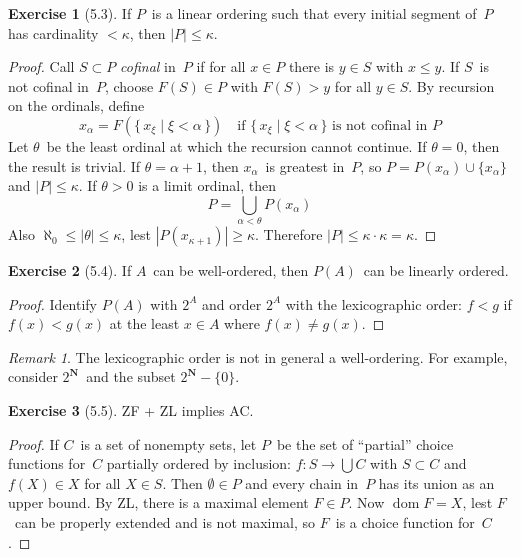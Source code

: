 \documentclass[letterpaper,12pt]{article}
\newcommand{\N}{\boldsymbol{N}}
\newcommand{\union}{\cup}
\newcommand{\bigunion}{\bigcup}
\newcommand{\mult}{\cdot}
\DeclareMathOperator{\dom}{dom}
\newcommand{\card}[1]{|#1|}
\theoremstyle{definition}
\newtheorem*{exer}{Exercise}
\theoremstyle{remark}
\newtheorem*{rmk}{Remark}
\begin{document}
\begin{exer}[5.3]
If \(P\)~is a linear ordering such that every initial segment of~\(P\) has cardinality \(<\kappa\), then \(\card{P}\le\kappa\).
\end{exer}
\begin{proof}
Call \(S\subset P\) \emph{cofinal} in~\(P\) if for all \(x\in P\) there is \(y\in S\) with \(x\le y\). If \(S\)~is not cofinal in~\(P\), choose \(F(S)\in P\) with \(F(S)>y\) for all \(y\in S\). By recursion on the ordinals, define
\[x_{\alpha}=F(\{\,x_{\xi}\mid\xi<\alpha\,\})\quad\text{if }\{\,x_{\xi}\mid\xi<\alpha\,\}\text{ is not cofinal in~\(P\)}\]
Let \(\theta\)~be the least ordinal at which the recursion cannot continue. If \(\theta=0\), then the result is trivial. If \(\theta=\alpha+1\), then \(x_{\alpha}\)~is greatest in~\(P\), so \(P=P(x_{\alpha})\union\{x_{\alpha}\}\) and \(\card{P}\le\kappa\). If \(\theta>0\) is a limit ordinal, then
\[P=\bigunion_{\alpha<\theta}P(x_{\alpha})\]
Also \(\aleph_0\le\card{\theta}\le\kappa\), lest \(\card{P(x_{\kappa+1})}\ge\kappa\). Therefore \(\card{P}\le\kappa\mult\kappa=\kappa\).
\end{proof}

\begin{exer}[5.4]
If \(A\)~can be well-ordered, then \(P(A)\)~can be linearly ordered.
\end{exer}
\begin{proof}
Identify \(P(A)\) with \(2^A\) and order \(2^A\) with the lexicographic order: \(f<g\) if \(f(x)<g(x)\) at the least \(x\in A\) where \(f(x)\ne g(x)\).
\end{proof}
\begin{rmk}
The lexicographic order is not in general a well-ordering. For example, consider \(2^{\N}\)~and the subset \(2^{\N}-\{0\}\).
\end{rmk}

\begin{exer}[5.5]
ZF + ZL implies AC.
\end{exer}
\begin{proof}
If \(C\)~is a set of nonempty sets, let \(P\)~be the set of ``partial'' choice functions for~\(C\) partially ordered by inclusion: \(f:S\to\bigunion C\) with \(S\subset C\) and \(f(X)\in X\) for all \(X\in S\). Then \(\emptyset\in P\) and every chain in~\(P\) has its union as an upper bound. By ZL, there is a maximal element \(F\in P\). Now \(\dom F=X\), lest \(F\)~can be properly extended and is not maximal, so \(F\)~is a choice function for~\(C\).
\end{proof}
\end{document}
